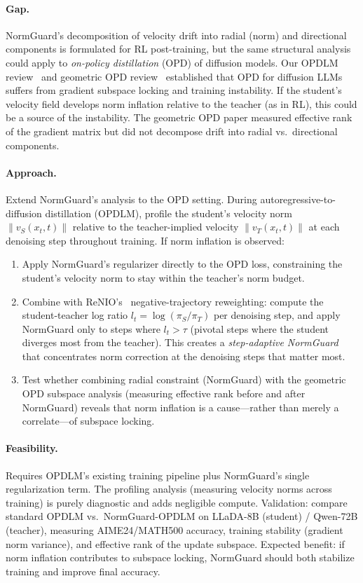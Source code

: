 \documentclass[11pt,a4paper]{article}
\begin{document}
\paragraph{Gap.} NormGuard's decomposition of velocity drift into radial (norm) and directional components is formulated for RL post-training, but the same structural analysis could apply to \emph{on-policy distillation} (OPD) of diffusion models. Our OPDLM review~\cite{ye2026opdlm} and geometric OPD review~\cite{shen2026geometry} established that OPD for diffusion LLMs suffers from gradient subspace locking and training instability. If the student's velocity field develops norm inflation relative to the teacher (as in RL), this could be a source of the instability. The geometric OPD paper measured effective rank of the gradient matrix but did not decompose drift into radial vs.\ directional components.

\paragraph{Approach.} Extend NormGuard's analysis to the OPD setting. During autoregressive-to-diffusion distillation (OPDLM), profile the student's velocity norm $\|v_S(x_t,t)\|$ relative to the teacher-implied velocity $\|v_T(x_t,t)\|$ at each denoising step throughout training. If norm inflation is observed:
\begin{enumerate}
\item Apply NormGuard's regularizer directly to the OPD loss, constraining the student's velocity norm to stay within the teacher's norm budget.
\item Combine with ReNIO's~\cite{lin2026renio} negative-trajectory reweighting: compute the student-teacher log ratio $l_t = \log(\pi_S/\pi_T)$ per denoising step, and apply NormGuard only to steps where $l_t > \tau$ (pivotal steps where the student diverges most from the teacher). This creates a \emph{step-adaptive NormGuard} that concentrates norm correction at the denoising steps that matter most.
\item Test whether combining radial constraint (NormGuard) with the geometric OPD subspace analysis (measuring effective rank before and after NormGuard) reveals that norm inflation is a cause---rather than merely a correlate---of subspace locking.
\end{enumerate}

\paragraph{Feasibility.} Requires OPDLM's existing training pipeline plus NormGuard's single regularization term. The profiling analysis (measuring velocity norms across training) is purely diagnostic and adds negligible compute. Validation: compare standard OPDLM vs.\ NormGuard-OPDLM on LLaDA-8B (student) / Qwen-72B (teacher), measuring AIME24/MATH500 accuracy, training stability (gradient norm variance), and effective rank of the update subspace. Expected benefit: if norm inflation contributes to subspace locking, NormGuard should both stabilize training and improve final accuracy.
\end{document}
